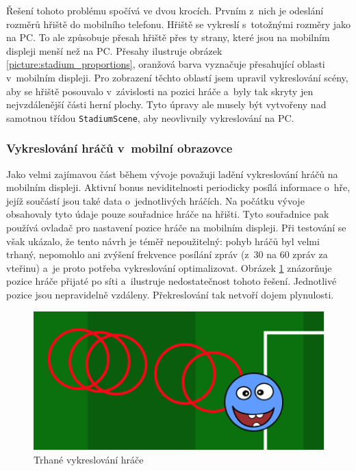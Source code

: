 \documentclass[thesis=B,czech,hidelinks]{FITthesis}[2012/06/26] %
\newcommand{\code}[1]{\texttt{#1}}
\begin{document}
Řešení tohoto problému spočívá ve dvou krocích. Prvním z~nich je odeslání rozměrů hřiště do mobilního telefonu. Hřiště se vykreslí s~totožnými rozměry jako na PC. To ale způsobuje přesah hřiště přes ty strany, které jsou na mobilním displeji menší než na PC. Přesahy ilustruje obrázek \ref{picture:stadium_proportions}, oranžová barva vyznačuje přesahující oblasti v~mobilním displeji. Pro zobrazení těchto oblastí jsem upravil vykreslování scény, aby se hřiště posouvalo v~závislosti na pozici hráče a~byly tak skryty jen nejvzdálenější části herní plochy. Tyto úpravy ale musely být vytvořeny nad samotnou třídou \code{StadiumScene}, aby neovlivnily vykreslování na PC.

\subsubsection{Vykreslování hráčů v~mobilní obrazovce}

Jako velmi zajímavou část během vývoje považuji ladění vykreslování hráčů na mobilním displeji. Aktivní bonus neviditelnosti periodicky posílá informace o~hře, jejíž součástí jsou také data o~jednotlivých hráčích. Na počátku vývoje obsahovaly tyto údaje pouze souřadnice hráče na hřišti. Tyto souřadnice pak používá ovladač pro nastavení pozice hráče na mobilním displeji. Při testování se však ukázalo, že tento návrh je téměř nepoužitelný: pohyb hráčů byl velmi trhaný, nepomohlo ani zvýšení frekvence posílání zpráv (z~30 na 60 zpráv za vteřinu) a~je proto potřeba vykreslování optimalizovat. Obrázek \ref{picture:player_rendering_1} znázorňuje pozice hráče přijaté po síti a~ilustruje nedostatečnost tohoto řešení. Jednotlivé pozice jsou nepravidelně vzdáleny. Překreslování tak netvoří dojem plynulosti.

\begin{figure}[h]
\center
\includegraphics[width=\textwidth]{player_rendering_1}
\caption{Trhané vykreslování hráče}
\label{picture:player_rendering_1}
\end{figure}
\end{document}
